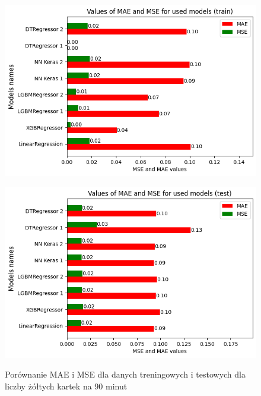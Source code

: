 \documentclass{article}
\begin{document}
\begin{figure}[H]
  \centering
  \begin{minipage}[b]{0.5\textwidth}
    \centering
    \includegraphics[width=\textwidth]{all_errors_1.png}
    \label{fig:all_errors_1}
  \end{minipage}%
  \begin{minipage}[b]{0.5\textwidth}
    \centering
    \includegraphics[width=\textwidth]{all_errors_2.png}
    \label{fig:all_errors_2}
  \end{minipage}
  \captionsetup{justification=centering}
  \caption{Porównanie MAE i MSE dla danych treningowych i testowych dla liczby żółtych kartek na 90 minut}
  \label{fig:all_errors_1_1}
\end{figure}
\end{document}
